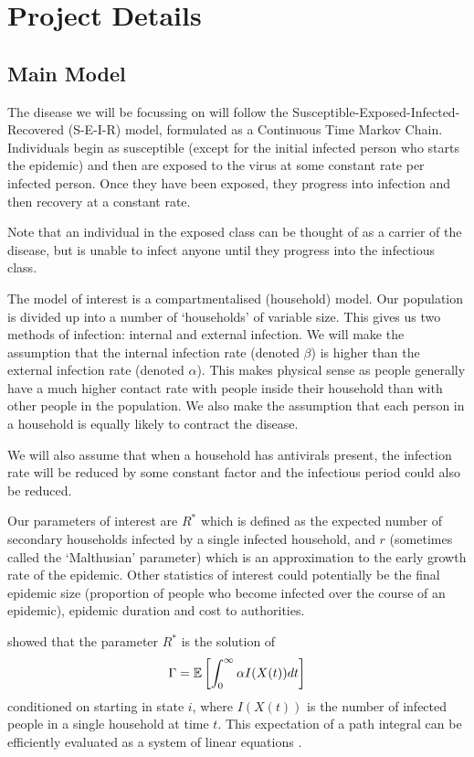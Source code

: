 \section{Project Details}
\subsection{Main Model}
The disease we will be focussing on will follow the Susceptible-Exposed-Infected-Recovered (S-E-I-R) model, formulated as a Continuous Time Markov Chain. Individuals begin as susceptible (except for the initial infected person who starts the epidemic) and then are exposed to the virus at some constant rate per infected person. Once they have been exposed, they progress into infection and then recovery at a constant rate.

Note that an individual in the exposed class can be thought of as a carrier of the disease, but is unable to infect anyone until they progress into the infectious class.

The model of interest is a compartmentalised (household) model. Our population is divided up into a number of `households' of variable size. This gives us two methods of infection: internal and external infection. We will make the assumption that the internal infection rate (denoted $\beta$) is higher than the external infection rate (denoted $\alpha$). This makes physical sense as people generally have a much higher contact rate with people inside their household than with other people in the population. We also make the assumption that each person in a household is equally likely to contract the disease.

We will also assume that when a household has antivirals present, the infection rate will be reduced by some constant factor and the infectious period could also be reduced.

Our parameters of interest are $R^*$ which is defined as the expected number of secondary households infected by a single infected household, and $r$ (sometimes called the `Malthusian' parameter) which is an approximation to the early growth rate of the epidemic. Other statistics of interest could potentially be the final epidemic size (proportion of people who become infected over the course of an epidemic), epidemic duration and cost to authorities.

\cite{Ross:2010} showed that the parameter $R^*$ is the solution of
\begin{equation}
\Gamma=\mathbb{E}\left[\int_0^\infty \alpha I(X(t)) dt\right] \label{Eqn: R* 1}
\end{equation}
conditioned on starting in state $i$, where $I(X(t))$ is the number of infected people in a single household at time $t$. This expectation of a path integral can be efficiently evaluated as a system of linear equations \cite{Pollett:2002}.

